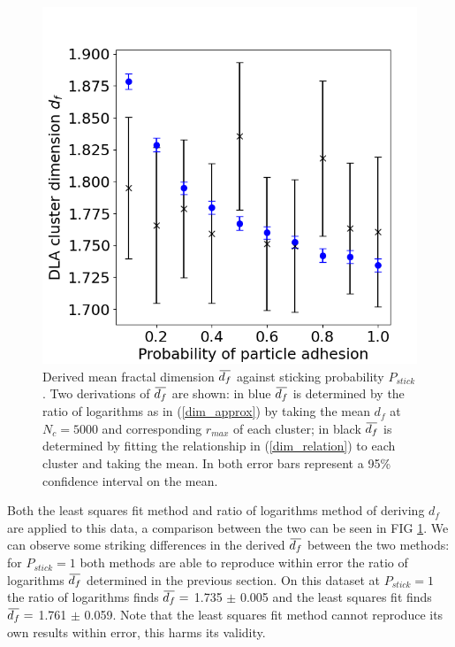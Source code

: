 \documentclass[10pt, twocolumn]{article} %
\newcommand{\overbar}[1]{\mkern 1.5mu\overline{\mkern-1.5mu#1\mkern-1.5mu}\mkern 1.5mu}
\begin{document}
\begin{figure}[t]
\centering
\includegraphics[width=0.95\columnwidth]{stick_dims_together.png}
  \caption{
    Derived mean fractal dimension $\overbar{d_f}$ against sticking probability $P_{stick}$. Two derivations of $\overbar{d_f}$ are shown: in blue $\overbar{d_f}$ is determined by the ratio of logarithms as in (\ref{dim_approx}) by taking the mean $d_f$ at $N_c=5000$ and corresponding $r_{max}$ of each cluster; in black $\overbar{d_f}$ is determined by fitting the relationship in (\ref{dim_relation}) to each cluster and taking the mean. In both error bars represent a 95\% confidence interval on the mean.
  }
  \label{stick_dims_together}
\end{figure}

  Both the least squares fit method and ratio of logarithms method of deriving $d_f$ are applied to this data, a comparison between the two can be seen in FIG \ref{stick_dims_together}. We can observe some striking differences in the derived $\overbar{d_f}$ between the two methods: for $P_{stick}=1$ both methods are able to reproduce within error the ratio of logarithms $\overbar{d_f}$ determined in the previous section. On this dataset at $P_{stick} = 1$ the ratio of logarithms finds $\overbar{d_f} =$ 1.735 $\pm$ 0.005 and the least squares fit finds $\overbar{d_f} = $ 1.761 $\pm$ 0.059. Note that the least squares fit method cannot reproduce its own results within error, this harms its validity.
  
\end{document}
